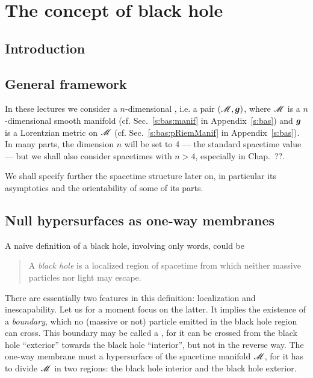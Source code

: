 \chapter{The concept of black hole}

\section{Introduction}

\section{General framework}

In these lectures we consider a $n$-dimensional ,
i.e. a pair $(\mathscr{M}, \bm{g})$, where $\mathscr{M}$ is a $n$-dimensional smooth manifold
(cf. Sec.~\ref{s:bas:manif} in Appendix~\ref{s:bas}) and $\bm{g}$ is a
Lorentzian metric on $\mathscr{M}$ (cf. Sec.~\ref{s:bas:pRiemManif} in
Appendix~\ref{s:bas}). In many parts, the dimension $n$ will be set to 4
--- the standard spacetime value --- but we shall also consider spacetimes with
$n>4$, especially in Chap.~??.

We shall specify further the spacetime structure later on, in particular its
asymptotics and the orientability of some of its parts.


\section{Null hypersurfaces as one-way membranes}

A naive definition of a black hole, involving only words, could be
\begin{quote}
A \emph{black hole} is a localized region of spacetime
from which neither massive particles nor light may escape.
\end{quote}
There are essentially two features in this definition: localization
and inescapability. Let us for a moment focus on the latter.
It implies the existence of a \emph{boundary}, which no
(massive or not) particle emitted in the black hole region can cross.
This boundary may be called a
,
for it can be crossed from the black hole ``exterior'' towards the black hole
``interior'', but not in the reverse way. The one-way membrane must
a hypersurface of the spacetime manifold $\mathscr{M}$, for it has to divide $\mathscr{M}$ in two regions:
the black hole interior and the black hole exterior.


